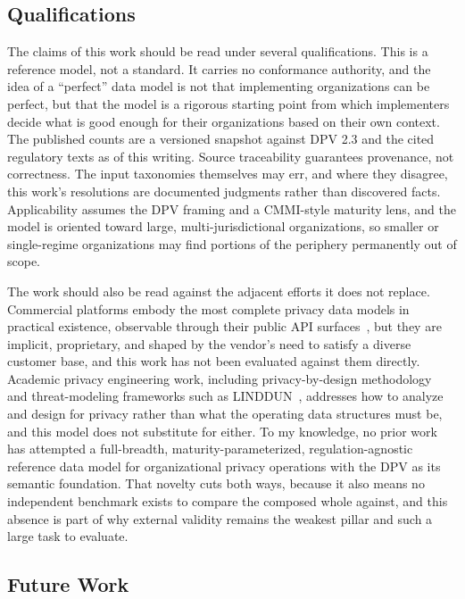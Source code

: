\documentclass[10pt,letterpaper,twocolumn,twoside]{rho-class/rho}
\begin{document}
\subsection{Qualifications}\label{sec:qualifications}

The claims of this work should be read under several qualifications. This is a reference model, not a standard. It carries no conformance authority, and the idea of a ``perfect'' data model is not that implementing organizations can be perfect, but that the model is a rigorous starting point from which implementers decide what is good enough for their organizations based on their own context. The published counts are a versioned snapshot against DPV 2.3 and the cited regulatory texts as of this writing. Source traceability guarantees provenance, not correctness. The input taxonomies themselves may err, and where they disagree, this work's resolutions are documented judgments rather than discovered facts. Applicability assumes the DPV framing and a CMMI-style maturity lens, and the model is oriented toward large, multi-jurisdictional organizations, so smaller or single-regime organizations may find portions of the periphery permanently out of scope.

The work should also be read against the adjacent efforts it does not replace. Commercial platforms embody the most complete privacy data models in practical existence, observable through their public API surfaces~\cite{bigid_api_overview, datagrail_api_v2_reference, onetrust_api_reference, securiti_api_reference, trustarc_gateway_api_developers_guide}, but they are implicit, proprietary, and shaped by the vendor's need to satisfy a diverse customer base, and this work has not been evaluated against them directly. Academic privacy engineering work, including privacy-by-design
methodology~\cite{cavoukian2011pbd, cronkspbd} and threat-modeling frameworks such as LINDDUN~\cite{linddun}, addresses how to analyze and design for privacy rather than what the operating data structures must be, and this model does not substitute for either. To my knowledge, no prior work has attempted a full-breadth, maturity-parameterized, regulation-agnostic reference data model for organizational privacy operations with the DPV as its semantic foundation. That novelty cuts both ways, because it also means no independent benchmark exists to compare the composed whole against, and this absence is part of why external validity remains the weakest pillar and such a large task to evaluate.

\subsection{Future Work}\label{sec:futurework}
\end{document}
